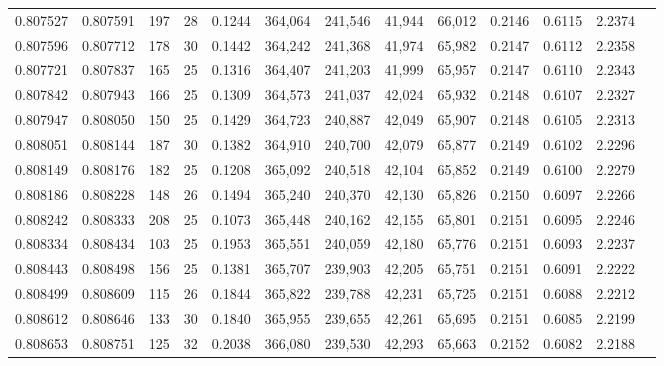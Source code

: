 \begin{tabular}{rrrrrrrrrrrrr}
0.807527 & 0.807591 &   197 &  28 &                                     0.1244 & 364,064 & 241,546 &  41,944 &  66,012 & 0.2146 & 0.6115 & 2.2374 \\
0.807596 & 0.807712 &   178 &  30 &                                     0.1442 & 364,242 & 241,368 &  41,974 &  65,982 & 0.2147 & 0.6112 & 2.2358 \\
0.807721 & 0.807837 &   165 &  25 &                                     0.1316 & 364,407 & 241,203 &  41,999 &  65,957 & 0.2147 & 0.6110 & 2.2343 \\
0.807842 & 0.807943 &   166 &  25 &                                     0.1309 & 364,573 & 241,037 &  42,024 &  65,932 & 0.2148 & 0.6107 & 2.2327 \\
0.807947 & 0.808050 &   150 &  25 &                                     0.1429 & 364,723 & 240,887 &  42,049 &  65,907 & 0.2148 & 0.6105 & 2.2313 \\
0.808051 & 0.808144 &   187 &  30 &                                     0.1382 & 364,910 & 240,700 &  42,079 &  65,877 & 0.2149 & 0.6102 & 2.2296 \\
0.808149 & 0.808176 &   182 &  25 &                                     0.1208 & 365,092 & 240,518 &  42,104 &  65,852 & 0.2149 & 0.6100 & 2.2279 \\
0.808186 & 0.808228 &   148 &  26 &                                     0.1494 & 365,240 & 240,370 &  42,130 &  65,826 & 0.2150 & 0.6097 & 2.2266 \\
0.808242 & 0.808333 &   208 &  25 &                                     0.1073 & 365,448 & 240,162 &  42,155 &  65,801 & 0.2151 & 0.6095 & 2.2246 \\
0.808334 & 0.808434 &   103 &  25 &                                     0.1953 & 365,551 & 240,059 &  42,180 &  65,776 & 0.2151 & 0.6093 & 2.2237 \\
0.808443 & 0.808498 &   156 &  25 &                                     0.1381 & 365,707 & 239,903 &  42,205 &  65,751 & 0.2151 & 0.6091 & 2.2222 \\
0.808499 & 0.808609 &   115 &  26 &                                     0.1844 & 365,822 & 239,788 &  42,231 &  65,725 & 0.2151 & 0.6088 & 2.2212 \\
0.808612 & 0.808646 &   133 &  30 &                                     0.1840 & 365,955 & 239,655 &  42,261 &  65,695 & 0.2151 & 0.6085 & 2.2199 \\
0.808653 & 0.808751 &   125 &  32 &                                     0.2038 & 366,080 & 239,530 &  42,293 &  65,663 & 0.2152 & 0.6082 & 2.2188 \\

\end{tabular}
